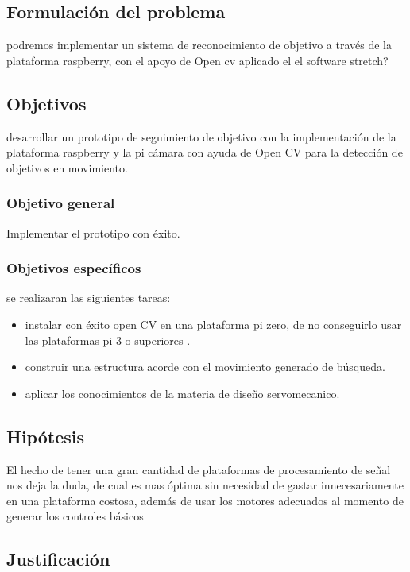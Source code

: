 \subsection*{Formulación del problema}

podremos implementar un sistema de reconocimiento de objetivo a través de  la plataforma raspberry, con el apoyo de Open cv aplicado el el software stretch?

\subsection*{Objetivos}

desarrollar un prototipo de seguimiento de objetivo con la implementación de la plataforma raspberry y la pi cámara con ayuda de Open CV para la detección de objetivos en movimiento.

\subsubsection*{Objetivo general}

Implementar el prototipo con éxito.

\subsubsection*{Objetivos específicos}

se realizaran las siguientes tareas:
\begin{itemize}
\item instalar con éxito open CV en una plataforma pi zero, de no conseguirlo usar las plataformas pi 3 o superiores .
\item construir una estructura acorde con el movimiento generado de búsqueda.
\item aplicar los conocimientos de la materia de diseño servomecanico. 
\end{itemize}


\subsection*{Hipótesis}

El hecho de tener una gran cantidad de plataformas de procesamiento de señal nos deja la duda, de cual es mas óptima sin necesidad de gastar innecesariamente en una plataforma costosa, además de usar los motores adecuados al momento de generar los controles básicos 


\subsection*{Justificación}

